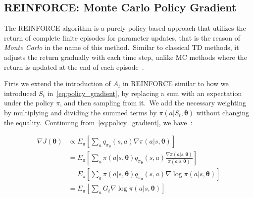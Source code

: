 \documentclass[../xlapes02]{subfiles}
\begin{document}
    \subsection{REINFORCE: Monte Carlo Policy Gradient}\label{subsec:monte-carlo-policy-gradient-methods}
    The REINFORCE algorithm is a purely policy-based approach that utilizes the return of complete finite episodes for parameter updates, that is the reason of \emph{Monte Carlo} in the name of this method.\ Similar to classical TD methods, it adjusts the return gradually with each time step, unlike MC methods where the return is updated at the end of each episode~\cite{rl-course-david-silver, sutton2018reinforcement}.

    Firts we extend the introduction of $A_t$ in REINFORCE similar to how we introduced $S_t$ in~\cref{eq:policy_gradient}, by replacing a sum with an expectation under the policy $\pi$, and then sampling from it.\ We add the necessary weighting by multiplying and dividing the summed terms by $\pi(a|S_t, \bm{\theta})$ without changing the equality.\ Continuing from~\cref{eq:policy_gradient}, we have~\cite{sutton2018reinforcement, rl-course-david-silver}:

    \begin{equation}
        \label{eq:policy_gradient_2}
        \begin{split}
            \nabla J(\bm{\theta})&\propto E_{\pi}\left[\sum_{a}q_{\pi_{\bm{\theta}}}(s,a)\nabla\pi(a|s,\bm{\theta})\right]\\
            &=E_{\pi}\left[\sum_{a}\pi(a|s,\bm{\theta})q_{\pi_{\bm{\theta}}}(s,a)\frac{\nabla\pi(a|s,\bm{\theta})}{\pi(a|s,\bm{\theta})}\right]\\
            &=E_{\pi}\left[\sum_{a}\pi(a|s,\bm{\theta})q_{\pi_{\bm{\theta}}}(s,a)\nabla\log\pi(a|s,\bm{\theta})\right]\\
            &=E_{\pi}\left[\sum_{a}G_t\nabla\log\pi(a|s,\bm{\theta})\right]
        \end{split}
    \end{equation}
\end{document}
